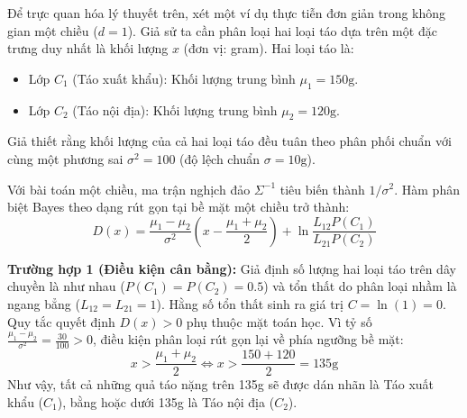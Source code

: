 Để trực quan hóa lý thuyết trên, xét một ví dụ thực tiễn đơn giản trong không gian một chiều ($d=1$). Giả sử ta cần phân loại hai loại táo dựa trên một đặc trưng duy nhất là khối lượng $x$ (đơn vị: gram). Hai loại táo là:
\begin{itemize}
    \item Lớp $C_1$ (Táo xuất khẩu): Khối lượng trung bình $\mu_1 = 150\text{g}$.
    \item Lớp $C_2$ (Táo nội địa): Khối lượng trung bình $\mu_2 = 120\text{g}$.
\end{itemize}
Giả thiết rằng khối lượng của cả hai loại táo đều tuân theo phân phối chuẩn với cùng một phương sai $\sigma^2 = 100$ (độ lệch chuẩn $\sigma = 10\text{g}$). 

Với bài toán một chiều, ma trận nghịch đảo $\Sigma^{-1}$ tiêu biến thành $1/\sigma^2$. Hàm phân biệt Bayes theo dạng rút gọn tại bề mặt một chiều trở thành:
\begin{equation}
    D(x) = \frac{\mu_1 - \mu_2}{\sigma^2} \left( x - \frac{\mu_1 + \mu_2}{2} \right) + \ln \frac{L_{12} P(C_1)}{L_{21} P(C_2)}
\end{equation}

\textbf{Trường hợp 1 (Điều kiện cân bằng):} 
Giả định số lượng hai loại táo trên dây chuyền là như nhau ($P(C_1) = P(C_2) = 0.5$) và tổn thất do phân loại nhầm là ngang bẳng ($L_{12} = L_{21} = 1$). Hằng số tổn thất sinh ra giá trị $C = \ln(1) = 0$. Quy tắc quyết định $D(x) > 0$ phụ thuộc mặt toán học. Vì tỷ số $\frac{\mu_1 - \mu_2}{\sigma^2} = \frac{30}{100} > 0$, điều kiện phân loại rút gọn lại về phía ngưỡng bề mặt:
\begin{equation}
     x > \frac{\mu_1 + \mu_2}{2} \iff x > \frac{150 + 120}{2} = 135 \text{g}
\end{equation}
Như vậy, tất cả những quả táo nặng trên 135g sẽ được dán nhãn là Táo xuất khẩu ($C_1$), bằng hoặc dưới 135g là Táo nội địa ($C_2$).


